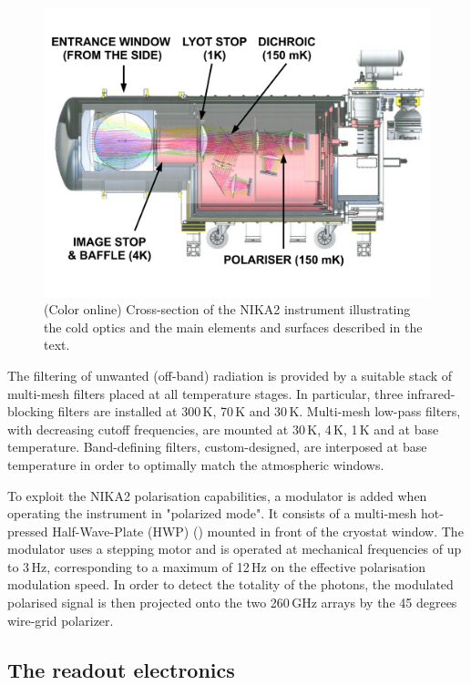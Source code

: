 \documentclass[]{aa} %
\begin{document}
\begin{figure}[h]
   \centering
   \includegraphics[width=.95\linewidth]{NIKA2_optics.pdf}
      \caption{(Color online) Cross-section of the NIKA2 instrument illustrating the cold optics and the main elements and surfaces described in the text.}
         \label{Cryostat_optics}
\end{figure}

The filtering of unwanted (off-band) radiation is provided by a suitable stack of multi-mesh filters placed at all temperature stages. In particular, three infrared-blocking filters are installed at 300\,K, 70\,K and 30\,K. Multi-mesh low-pass filters, with decreasing cutoff frequencies, are mounted at 30\,K, 4\,K, 1\,K and at base temperature. Band-defining filters, custom-designed, are interposed at base temperature in order to optimally match the atmospheric windows. 

To exploit the NIKA2 polarisation capabilities, a modulator is added when operating the instrument in "polarized mode". It consists of a multi-mesh hot-pressed Half-Wave-Plate (HWP) (\cite{Pisano2016}) mounted in front of the cryostat window. The modulator uses a stepping motor and is operated at mechanical frequencies of up to 3\,Hz, corresponding to a maximum of 12\,Hz on the effective polarisation modulation speed. In order to detect the totality of the photons, the modulated polarised signal is then projected onto the two 260\,GHz arrays by the 45 degrees wire-grid polarizer.  


 \subsection{The readout electronics}
\end{document}

